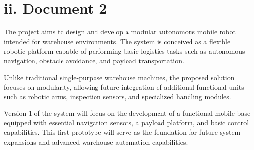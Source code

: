 \section*{ii. Document 2}

The project aims to design and develop a modular autonomous mobile robot intended for warehouse environments. The system is conceived as a flexible robotic platform capable of performing basic logistics tasks such as autonomous navigation, obstacle avoidance, and payload transportation.

Unlike traditional single-purpose warehouse machines, the proposed solution focuses on modularity, allowing future integration of additional functional units such as robotic arms, inspection sensors, and specialized handling modules.

Version 1 of the system will focus on the development of a functional mobile base equipped with essential navigation sensors, a payload platform, and basic control capabilities. This first prototype will serve as the foundation for future system expansions and advanced warehouse automation capabilities.
